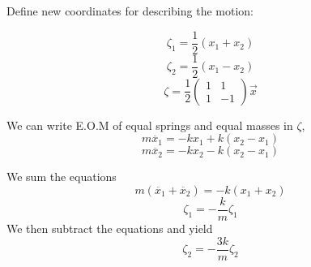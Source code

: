 \documentclass{article}
\newtheorem{one minute paper}[theorem]{One Minute Paper}
\begin{document}
Define new coordinates for describing the motion:

\begin{equation}
    \zeta_1 = \frac{1}{2}(x_1 + x_2)
\end{equation}
\begin{equation}
    \zeta_2 = \frac{1}{2}(x_1 - x_2)
\end{equation}
\begin{equation}
    \zeta = \frac{1}{2}\begin{pmatrix}
        1 & 1 \\
        1 & -1
    \end{pmatrix}\vec{x}
\end{equation}

We can write E.O.M of equal springs and equal masses in $\zeta$, 
\begin{equation}
    m\ddot{x_1} = -kx_1 + k(x_2 - x_1)
\end{equation}
\begin{equation}
    m\ddot{x_2} = -kx_2 - k(x_2 - x_1)
\end{equation}

We sum the equations 
\begin{equation}
    m(\ddot{x_1} + \ddot{x_2}) = -k(x_1 + x_2)
\end{equation}
\begin{equation}
    \zeta_1 = -\frac{k}{m}\zeta_1
\end{equation}
We then subtract the equations and yield 
\begin{equation}
    \zeta_2 = -\frac{3k}{m}\zeta_2
\end{equation}
\end{document}
